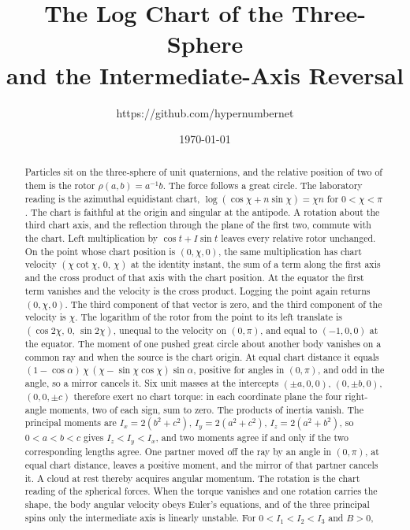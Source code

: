 \documentclass[a4paper]{article}
\title{The Log Chart of the Three-Sphere\\
and the Intermediate-Axis Reversal}
\author{https://github.com/hypernumbernet}
\date{\today}
\begin{document}
\maketitle

\begin{abstract}
Particles sit on the three-sphere of unit quaternions, and the relative position of two of them is the rotor \(\rho(a,b)=a^{-1}b\). The force follows a great circle. The laboratory reading is the azimuthal equidistant chart, \(\log(\cos\chi+n\sin\chi)=\chi n\) for \(0<\chi<\pi\). The chart is faithful at the origin and singular at the antipode. A rotation about the third chart axis, and the reflection through the plane of the first two, commute with the chart. Left multiplication by \(\cos t+I\sin t\) leaves every relative rotor unchanged. On the point whose chart position is \((0,\chi,0)\), the same multiplication has chart velocity \((\chi\cot\chi,\,0,\,\chi)\) at the identity instant, the sum of a term along the first axis and the cross product of that axis with the chart position. At the equator the first term vanishes and the velocity is the cross product. Logging the point again returns \((0,\chi,0)\). The third component of that vector is zero, and the third component of the velocity is \(\chi\). The logarithm of the rotor from the point to its left translate is \((\cos 2\chi,\,0,\,\sin 2\chi)\), unequal to the velocity on \((0,\pi)\), and equal to \((-1,0,0)\) at the equator. The moment of one pushed great circle about another body vanishes on a common ray and when the source is the chart origin. At equal chart distance it equals \((1-\cos\alpha)\,\chi\,(\chi-\sin\chi\cos\chi)\sin\alpha\), positive for angles in \((0,\pi)\), and odd in the angle, so a mirror cancels it. Six unit masses at the intercepts \((\pm a,0,0)\), \((0,\pm b,0)\), \((0,0,\pm c)\) therefore exert no chart torque: in each coordinate plane the four right-angle moments, two of each sign, sum to zero. The products of inertia vanish. The principal moments are \(I_x=2(b^2+c^2)\), \(I_y=2(a^2+c^2)\), \(I_z=2(a^2+b^2)\), so \(0<a<b<c\) gives \(I_z<I_y<I_x\), and two moments agree if and only if the two corresponding lengths agree. One partner moved off the ray by an angle in \((0,\pi)\), at equal chart distance, leaves a positive moment, and the mirror of that partner cancels it. A cloud at rest thereby acquires angular momentum. The rotation is the chart reading of the spherical forces. When the torque vanishes and one rotation carries the shape, the body angular velocity obeys Euler's equations, and of the three principal spins only the intermediate axis is linearly unstable. For \(0<I_1<I_2<I_3\) and \(B>0\),

\end{abstract}
\end{document}
